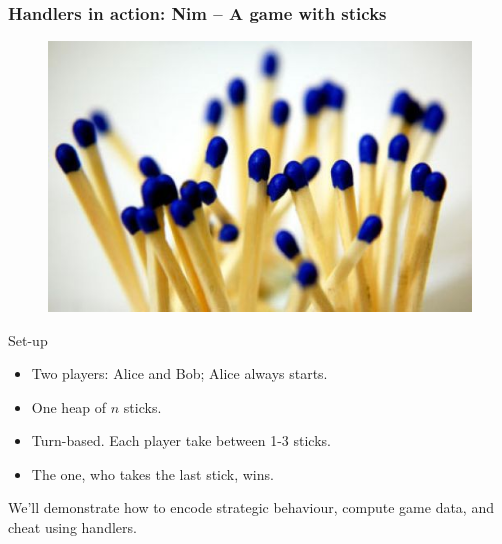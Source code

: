 \begin{frame}
  \frametitle{Handlers in action: Nim -- A game with sticks}
  \begin{center}
    \begin{figure}
      \includegraphics[scale=0.3]{sticks.jpg}
    \end{figure}
  \end{center}
  Set-up
  \begin{itemize}
    \item Two players: Alice and Bob; Alice always starts.
    \item One heap of $n$ sticks.
    \item Turn-based. Each player take between 1-3 sticks.
    \item The one, who takes the last stick, wins.
  \end{itemize}
We'll demonstrate how to encode strategic behaviour, compute game data, and cheat using handlers.
\end{frame}


